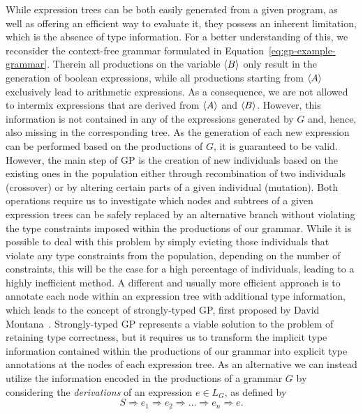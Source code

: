While expression trees can be both easily generated from a given program, as well as offering an efficient way to evaluate it, they possess an inherent limitation, which is the absence of type information.
For a better understanding of this, we reconsider the context-free grammar formulated in Equation~\eqref{eq:gp-example-grammar}.
Therein all productions on the variable $\langle B \rangle$ only result in the generation of boolean expressions, while all productions starting from $\langle A \rangle$ exclusively lead to arithmetic expressions.
As a consequence, we are not allowed to intermix expressions that are derived from $\langle A \rangle$ and $\langle B \rangle$.
However, this information is not contained in any of the expressions generated by $G$ and, hence, also missing in the corresponding tree.
As the generation of each new expression can be performed based on the productions of $G$, it is guaranteed to be valid.
However, the main step of GP is the creation of new individuals based on the existing ones in the population either through recombination of two individuals (crossover) or by altering certain parts of a given individual (mutation). 
Both operations require us to investigate which nodes and subtrees of a given expression trees can be safely replaced by an alternative branch without violating the type constraints imposed within the productions of our grammar.
While it is possible to deal with this problem by simply evicting those individuals that violate any type constraints from the population, depending on the number of constraints, this will be the case for a high percentage of individuals, leading to a highly inefficient method.
A different and usually more efficient approach is to annotate each node within an expression tree with additional type information, which leads to the concept of strongly-typed GP, first proposed by David Montana~\cite{montana1995strongly}.
Strongly-typed GP represents a viable solution to the problem of retaining type correctness, but it requires us to transform the implicit type information contained within the productions of our grammar into explicit type annotations at the nodes of each expression tree.
As an alternative we can instead utilize the information encoded in the productions of a grammar $G$ by considering the \emph{derivations} of an expression $e \in L_G$, as defined by
\begin{equation}
	S \Rightarrow e_1 \Rightarrow e_2 \Rightarrow \dots \Rightarrow e_n \Rightarrow e.
\end{equation}
